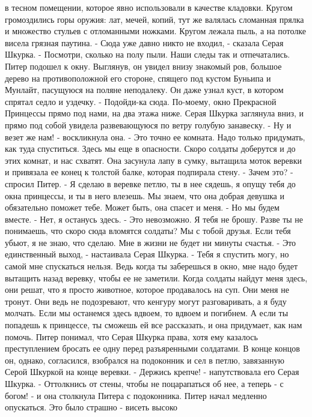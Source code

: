 в тесном помещении, которое явно использовали в качестве кладовки. 
Кругом громоздились горы оружия: лат, мечей, копий, тут же валялась 
сломанная прялка и множество стульев с отломанными ножками. Кругом 
лежала пыль, а на потолке висела грязная паутина.
    - Сюда уже давно никто не входил, - сказала Серая Шкурка. - 
Посмотри, сколько на полу пыли. Наши следы так и отпечатались.
    Питер подошел к окну. Выглянув, он увидел внизу знакомый ров, 
большое дерево на противоположной его стороне, спящего под кустом 
Буньипа и Мунлайт, пасущуюся на поляне неподалеку. Он даже узнал куст, 
в котором спрятал седло и уздечку.
    - Подойди-ка сюда. По-моему, окно Прекрасной Принцессы прямо под 
нами, на два этажа ниже.
    Серая Шкурка заглянула вниз, и прямо под собой увидела 
развевающуюся по ветру голубую занавеску.
    - Ну и везет же нам! - воскликнула она. - Это точно ее комната. 
Надо только придумать, как туда спуститься. Здесь мы еще в опасности. 
Скоро солдаты доберутся и до этих комнат, и нас схватят.
    Она засунула лапу в сумку, вытащила моток веревки и привязала ее 
конец к толстой балке, которая подпирала стену.
    - Зачем это? - спросил Питер.
    - Я сделаю в веревке петлю, ты в нее сядешь, я опущу тебя до окна 
принцессы, и ты в него влезешь. Мы знаем, что она добрая девушка и 
обязательно поможет тебе. Может быть, она спасет и меня.
    - Но мы будем вместе.
    - Нет, я останусь здесь.
    - Это невозможно. Я тебя не брошу. Разве ты не понимаешь, что 
скоро сюда вломятся солдаты? Мы с тобой друзья. Если тебя убьют, я не 
знаю, что сделаю. Мне в жизни не будет ни минуты счастья.
    - Это единственный выход, - настаивала Серая Шкурка. - Тебя я 
спустить могу, но самой мне спускаться нельзя. Ведь когда ты 
заберешься в окно, мне надо будет вытащить назад веревку, чтобы ее не 
заметили. Когда солдаты найдут меня здесь, они решат, что я просто 
животное, которое продавалось на суп. Они меня не тронут. Они ведь не 
подозревают, что кенгуру могут разговаривать, а я буду молчать. Если 
мы останемся здесь вдвоем, то вдвоем и погибнем. А если ты попадешь к 
принцессе, ты сможешь ей все рассказать, и она придумает, как нам 
помочь.
    Питер понимал, что Серая Шкурка права, хотя ему казалось 
преступлением бросать ее одну перед разъяренными солдатами. В конце 
концов он, однако, согласился, взобрался на подоконник и сел в петлю, 
завязанную Серой Шкуркой на конце веревки.
    - Держись крепче! - напутствовала его Серая Шкурка. - Оттолкнись 
от стены, чтобы не поцарапаться об нее, а теперь - с богом! - и она 
столкнула Питера с подоконника.
    Питер начал медленно опускаться. Это было страшно - висеть высоко 
